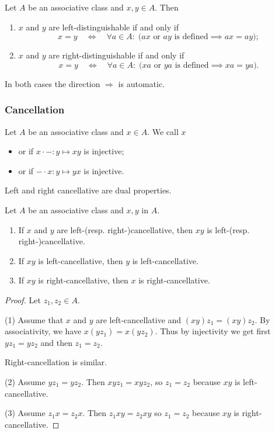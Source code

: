 \begin{lemma}
Let $A$ be an associative class and $x,y\in A$. 
Then
\begin{enumerate}
\item $x$ and $y$ are left-distinguishable \textup{if and only if}
\[ x = y \quad\iff\quad \forall a\in A: \;\Big(\text{$ax$ or $ay$ is defined} \implies ax = ay\Big); \]
\item $x$ and $y$ are right-distinguishable \textup{if and only if}
\[ x = y \quad\iff\quad \forall a\in A: \; \Big(\text{$xa$ or $ya$ is defined} \implies xa = ya\Big). \]
\end{enumerate}
In both cases the direction $\Rightarrow$ is automatic.
\end{lemma}

\subsubsection{Cancellation}
\begin{definition}
Let $A$ be an associative class and $x\in A$. 
We call $x$
\begin{itemize}
\item {} or  if $x\cdot -: y\mapsto xy$ is injective;
\item {} or  if $-\cdot x: y\mapsto yx$ is injective.
\end{itemize}
\end{definition}

Left and right cancellative are dual properties.

\begin{lemma}
Let $A$ be an associative class and $x,y$ in $A$.
\begin{enumerate}
\item If $x$ and $y$ are left-(resp. right-)cancellative, then $xy$ is left-(resp. right-)cancellative.
\item If $xy$ is left-cancellative, then $y$ is left-cancellative.
\item If $xy$ is right-cancellative, then $x$ is right-cancellative.
\end{enumerate}
\end{lemma}
\begin{proof}
Let $z_1, z_2\in A$.

(1) Assume that $x$ and $y$ are left-cancellative and $(xy)z_1 = (xy)z_2$. By associativity, we have $x(yz_1) = x(yz_2)$. Thus by injectivity we get first $yz_1 = yz_2$ and then $z_1 = z_2$.

Right-cancellation is similar.

(2) Assume $yz_1 = yz_2$. Then $xyz_1 = xyz_2$, so $z_1 = z_2$ because $xy$ is left-cancellative.

(3) Assume $z_1x = z_2x$. Then $z_1xy = z_2xy$ so $z_1 = z_2$ because $xy$ is right-cancellative.
\end{proof}

